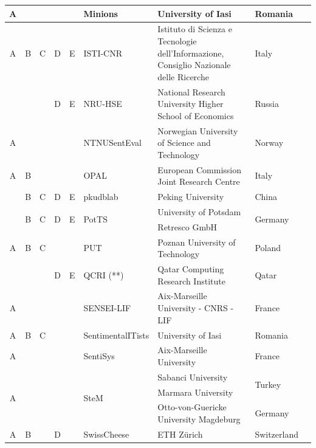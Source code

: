 \documentclass[11pt,letterpaper]{article}
\begin{document}
\begin{table}[htb]
\begin{center}
{\begin{tabular}{|ccccc|l|l|l|l|}
      A & & & & & Minions & University of Iasi & Romania & \cite{SemEval:2016:task4:Minions} \\ \hline 
      A & B & C & D & E & ISTI-CNR & Istituto di Scienza e Tecnologie dell'Informazione, Consiglio Nazionale delle Ricerche & Italy & \cite{SemEval:2016:task4:ISTI-CNR} \\ \hline 
      & & & D & E & NRU-HSE & National Research University Higher School of Economics & Russia & \cite{SemEval:2016:task4:NRU-HSE} \\ \hline 
      A & & & & & NTNUSentEval & Norwegian University of Science and Technology & Norway & \cite{SemEval:2016:task4:NTNUSentEval} \\ \hline 
      A & B & & & & OPAL & European Commission Joint Research Centre & Italy & \cite{SemEval:2016:task4:OPAL} \\ \hline 
      & B & C & D & E & pkudblab & Peking University & China &  \\ \hline 
      & \multirow{2}{*}{B} & \multirow{2}{*}{C} & \multirow{2}{*}{D} & \multirow{2}{*}{E} & \multirow{2}{*}{PotTS} & University of Potsdam & \multirow{2}{*}{Germany} & \multirow{2}{*}{\cite{SemEval:2016:task4:PotTS}} \\ 
      & & & & & & Retresco GmbH & & \\ \hline 
      A & B & C & & & PUT & Poznan University of Technology & Poland & \cite{SemEval:2016:task4:PUT} \\ \hline 
      & & & D & E & QCRI (**) & Qatar Computing Research Institute & Qatar & \cite{DaSanMartino:2016ty} \\ \hline 
      A & & & & & SENSEI-LIF & Aix-Marseille University - CNRS - LIF & France & \cite{SemEval:2016:task4:SENSEI-LIF} \\ \hline 
      A & B & C & & & SentimentalITists & University of Iasi & Romania & \cite{SemEval:2016:task4:SentimentalITists} \\ \hline 
      A & & & & & SentiSys & Aix-Marseille University & France & \cite{SemEval:2016:task4:SentiSys} \\ \hline 
      \multirow{3}{*}{A} & & & & & \multirow{3}{*}{SteM} & Sabanci University & \multirow{2}{*}{Turkey} & \multirow{3}{*}{\cite{SemEval:2016:task4:SteM}} \\ 
      & & & & & & Marmara University & &  \\
      & & & & & & Otto-von-Guericke University Magdeburg & Germany &  \\ \hline 
      A & B & & D & & SwissCheese & ETH Zürich & Switzerland & \cite{SemEval:2016:task4:SwissCheese} \\ \hline 

\end{tabular}}
\end{center}
\end{table}
\end{document}
